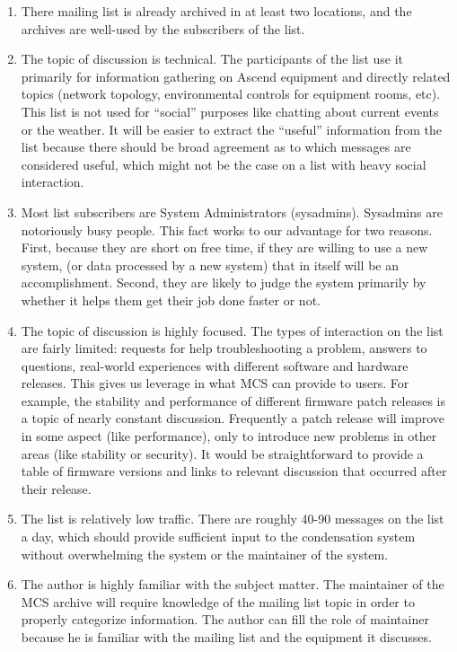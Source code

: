 \begin{enumerate}
\item There mailing list is already archived in at least two locations, and the
  archives are well-used by the subscribers of the list.
\label{enu:choice-archives}

\item The topic of discussion is technical. The participants of the list use it
  primarily for information gathering on Ascend equipment and directly related
  topics (network topology, environmental controls for equipment rooms, etc).
  This list is not used for ``social'' purposes like chatting about current
  events or the weather. It will be easier to extract the ``useful''
  information from the list because there should be broad agreement as to which
  messages are considered useful, which might not be the case on a list with
  heavy social interaction.
\label{enu:choice-topic}

\item Most list subscribers are System Administrators (sysadmins).  Sysadmins
  are notoriously busy people. This fact works to our advantage for two
  reasons.  First, because they are short on free time, if they are willing to
  use a new system, (or data processed by a new system) that in itself will be
  an accomplishment. Second, they are likely to judge the system primarily by
  whether it helps them get their job done faster or not.
  
\item The topic of discussion is highly focused. The types of interaction on
  the list are fairly limited: requests for help troubleshooting a problem,
  answers to questions, real-world experiences with different software and
  hardware releases. This gives us leverage in what MCS can provide to users.
  For example, the stability and performance of different firmware patch
  releases is a topic of nearly constant discussion. Frequently a patch release
  will improve in some aspect (like performance), only to introduce new
  problems in other areas (like stability or security). It would be
  straightforward to provide a table of firmware versions and links to relevant
  discussion that occurred after their release.

\item The list is relatively low traffic. There are roughly 40-90 messages
  on the list a day, which should provide sufficient input to the condensation
  system without overwhelming the system or the maintainer of the system.
  
\item The author is highly familiar with the subject matter. The maintainer of
  the MCS archive will require knowledge of the mailing list topic in order to
  properly categorize information. The author can fill the role of maintainer
  because he is familiar with the mailing list and the equipment it discusses.
\end{enumerate}

